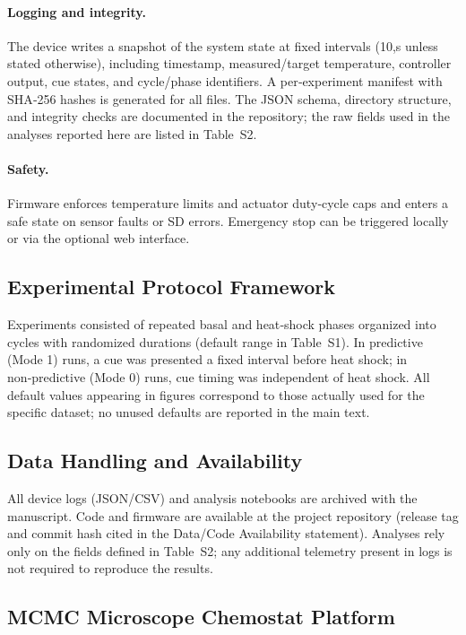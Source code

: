 \documentclass[aps,pre,twocolumn,floatfix,nofootinbib,amsmath,amssymb]{revtex4-2}
\begin{document}
\paragraph{Logging and integrity.} The device writes a snapshot of the system state at fixed intervals (10,s unless stated otherwise), including timestamp, measured/target temperature, controller output, cue states, and cycle/phase identifiers. A per‑experiment manifest with SHA‑256 hashes is generated for all files. The JSON schema, directory structure, and integrity checks are documented in the repository; the raw fields used in the analyses reported here are listed in Table~S2.

\paragraph{Safety.} Firmware enforces temperature limits and actuator duty‑cycle caps and enters a safe state on sensor faults or SD errors. Emergency stop can be triggered locally or via the optional web interface.

\subsection{Experimental Protocol Framework }

Experiments consisted of repeated basal and heat‑shock phases organized into cycles with randomized durations (default range in Table~S1). In predictive (Mode 1) runs, a cue was presented a fixed interval before heat shock; in non‑predictive (Mode 0) runs, cue timing was independent of heat shock. All default values appearing in figures correspond to those actually used for the specific dataset; no unused defaults are reported in the main text.

\subsection{Data Handling and Availability }

All device logs (JSON/CSV) and analysis notebooks are archived with the manuscript. Code and firmware are available at the project repository (release tag and commit hash cited in the Data/Code Availability statement). Analyses rely only on the fields defined in Table~S2; any additional telemetry present in logs is not required to reproduce the results.

\subsection{MCMC Microscope Chemostat Platform }
\end{document}
